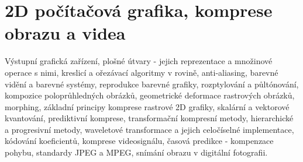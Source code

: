\newpage
\section{2D počítačová grafika, komprese obrazu a videa}
\begin{pozadavky}
\begin{pitemize}
\item Výstupní grafická zařízení, plošné útvary - jejich reprezentace a množinové operace s nimi, kreslicí a ořezávací algoritmy v rovině, anti-aliasing, barevné vidění a barevné systémy, reprodukce barevné grafiky, rozptylování a půltónování, kompozice poloprůhledných obrázků, geometrické deformace rastrových obrázků, morphing, základní principy komprese rastrové 2D grafiky, skalární a vektorové kvantování, prediktivní komprese, transformační kompresní metody, hierarchické a progresivní metody, waveletové transformace a jejich celočíselné implementace, kódování koeficientů, komprese videosignálu, časová predikce - kompenzace pohybu, standardy JPEG a MPEG, snímání obrazu v digitální fotografii.
\end{pitemize}
\end{pozadavky}